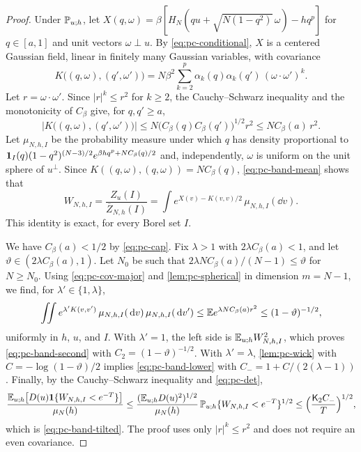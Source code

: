 \begin{proof}
Under $\mathbb P_{u;h}$, let $X(q,\omega)=\beta[H_N(qu+\sqrt{N(1-q^2)}\,\omega)-hq^p]$ for $q\in[a,1]$ and unit vectors $\omega\perp u$. By \eqref{eq:pc-conditional}, $X$ is a centered Gaussian field, linear in finitely many Gaussian variables, with covariance
\[
K\bigl((q,\omega),(q',\omega')\bigr)=N\beta^2\sum_{k=2}^p\alpha_k(q)\alpha_k(q')\,(\omega\cdot\omega')^k.
\]
Let $r=\omega\cdot\omega'$. Since $|r|^k\le r^2$ for $k\ge2$, the Cauchy--Schwarz inequality and the monotonicity of $C_\beta$ give, for $q,q'\ge a$,
\begin{equation}\label{eq:pc-cov-major}
\bigl|K\bigl((q,\omega),(q',\omega')\bigr)\bigr|\le N\bigl(C_\beta(q)C_\beta(q')\bigr)^{1/2}r^2\le NC_\beta(a)\,r^2.
\end{equation}
Let $\mu_{N,h,I}$ be the probability measure under which $q$ has density proportional to $\mathbf 1_I(q)(1-q^2)^{(N-3)/2}e^{\beta hq^p+NC_\beta(q)/2}$ and, independently, $\omega$ is uniform on the unit sphere of $u^\perp$. Since $K((q,\omega),(q,\omega))=NC_\beta(q)$, \eqref{eq:pc-band-mean} shows that
\begin{equation}\label{eq:pc-band-wick}
W_{N,h,I}=\frac{Z_u(I)}{\overline Z_{N,h}(I)}=\int e^{X(v)-K(v,v)/2}\,\mu_{N,h,I}(\dd v).
\end{equation}
This identity is exact, for every Borel set $I$.

We have $C_\beta(a)<1/2$ by \eqref{eq:pc-cap}. Fix $\lambda>1$ with $2\lambda C_\beta(a)<1$, and let $\vartheta\in(2\lambda C_\beta(a),1)$. Let $N_0$ be such that $2\lambda NC_\beta(a)/(N-1)\le\vartheta$ for $N\ge N_0$. Using \eqref{eq:pc-cov-major} and \cref{lem:pc-spherical} in dimension $m=N-1$, we find, for $\lambda'\in\{1,\lambda\}$,
\[
\iint e^{\lambda'K(v,v')}\,\mu_{N,h,I}(\,\mathrm d v)\,\mu_{N,h,I}(\,\mathrm d v')\le\mathbb E e^{\lambda NC_\beta(a)r^2}\le(1-\vartheta)^{-1/2},
\]
uniformly in $h$, $u$, and $I$. With $\lambda'=1$, the left side is $\mathbb E_{u;h}W_{N,h,I}^2$, which proves \eqref{eq:pc-band-second} with $C_2=(1-\vartheta)^{-1/2}$. With $\lambda'=\lambda$, \cref{lem:pc-wick} with $C=-\log(1-\vartheta)/2$ implies \eqref{eq:pc-band-lower} with $C_-=1+C/(2(\lambda-1))$. Finally, by the Cauchy--Schwarz inequality and \eqref{eq:pc-det},
\[
\frac{\mathbb E_{u;h}\bigl[D(u)\mathbf 1\{W_{N,h,I}<e^{-T}\}\bigr]}{\mu_N(h)}\le\frac{(\mathbb E_{u;h}D(u)^2)^{1/2}}{\mu_N(h)}\,\mathbb P_{u;h}\{W_{N,h,I}<e^{-T}\}^{1/2}\le\Bigl(\frac{\mathsf K_2C_-}T\Bigr)^{1/2},
\]
which is \eqref{eq:pc-band-tilted}. The proof uses only $|r|^k\le r^2$ and does not require an even covariance.
\end{proof}

